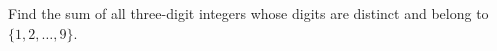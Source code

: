 Find the sum of all three-digit integers whose digits are distinct and belong to $\{1,2,\ldots,9\}$.
